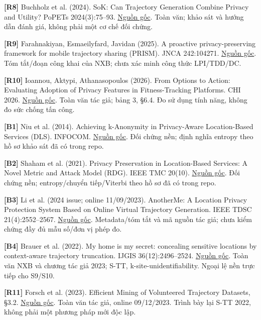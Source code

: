 \documentclass[10pt,a4paper]{article}
\begin{document}
\par\hypertarget{ref-R8}{}\textbf{[R8]} Buchholz et al. (2024). SoK: Can Trajectory Generation Combine Privacy and Utility? PoPETs 2024(3):75–93. \href{https://petsymposium.org/popets/2024/popets-2024-0068.pdf}{Nguồn gốc}. Toàn văn; khảo sát và hướng dẫn đánh giá, không phải một cơ chế đối chứng.
\par\hypertarget{ref-R9}{}\textbf{[R9]} Farahnakiyan, Esmaeilyfard, Javidan (2025). A proactive privacy-preserving framework for mobile trajectory sharing (PRISM). JNCA 242:104271. \href{https://www.sciencedirect.com/science/article/pii/S1084804525001687}{Nguồn gốc}. Tóm tắt/đoạn công khai của NXB; chưa xác minh công thức LPI/TDD/DC.
\par\hypertarget{ref-R10}{}\textbf{[R10]} Ioannou, Aktypi, Athanasopoulos (2026). From Options to Action: Evaluating Adoption of Privacy Features in Fitness-Tracking Platforms. CHI 2026. \href{https://elathan.github.io/papers/chi26.pdf}{Nguồn gốc}. Toàn văn tác giả; bảng 3, §6.4. Đo sử dụng tính năng, không đo sức chống tấn công.
\par\hypertarget{ref-B1}{}\textbf{[B1]} Niu et al. (2014). Achieving k-Anonymity in Privacy-Aware Location-Based Services (DLS). INFOCOM. \href{https://doi.org/10.1109/INFOCOM.2014.6848002}{Nguồn gốc}. Đối chứng nền; định nghĩa entropy theo hồ sơ khảo sát đã có trong repo.
\par\hypertarget{ref-B2}{}\textbf{[B2]} Shaham et al. (2021). Privacy Preservation in Location-Based Services: A Novel Metric and Attack Model (RDG). IEEE TMC 20(10). \href{https://doi.org/10.1109/TMC.2020.2993599}{Nguồn gốc}. Đối chứng nền; entropy/chuyển tiếp/Viterbi theo hồ sơ đã có trong repo.
\par\hypertarget{ref-B3}{}\textbf{[B3]} Li et al. (2024 issue; online 11/09/2023). AnotherMe: A Location Privacy Protection System Based on Online Virtual Trajectory Generation. IEEE TDSC 21(4):2552–2567. \href{https://ieeexplore.ieee.org/document/10246991/}{Nguồn gốc}. Metadata/tóm tắt và mã nguồn tác giả; chưa kiểm chứng đầy đủ mẫu số/đơn vị phép đo.
\par\hypertarget{ref-B4}{}\textbf{[B4]} Brauer et al. (2022). My home is my secret: concealing sensitive locations by context-aware trajectory truncation. IJGIS 36(12):2496–2524. \href{https://doi.org/10.1080/13658816.2022.2081694}{Nguồn gốc}. Toàn văn NXB và chương tác giả 2023; S-TT, k-site-unidentifiability. Ngoại lệ nền trực tiếp cho S9/S10.
\par\hypertarget{ref-R11}{}\textbf{[R11]} Forsch et al. (2023). Efficient Mining of Volunteered Trajectory Datasets, §3.2. \href{https://link.springer.com/chapter/10.1007/978-3-031-35374-1_3}{Nguồn gốc}. Toàn văn tác giả, online 09/12/2023. Trình bày lại S-TT 2022, không phải một phương pháp mới độc lập.
\end{document}
